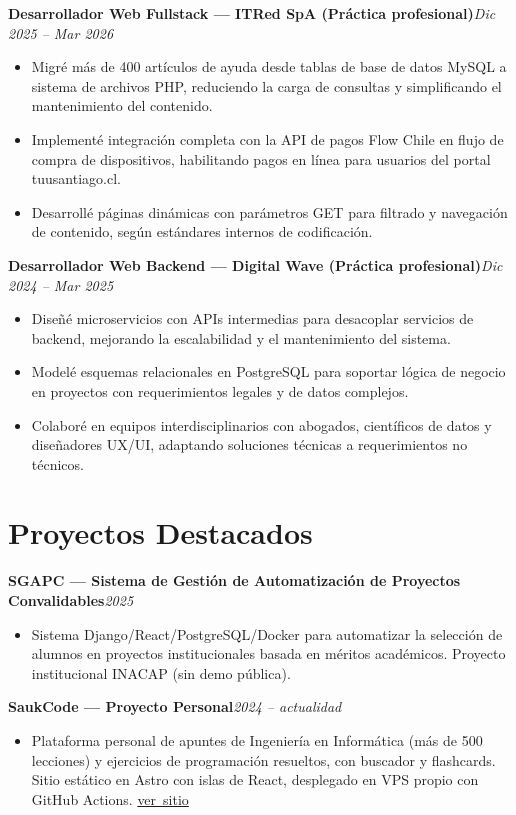 \documentclass[10pt,a4paper]{article}
\newcommand{\entryheader}[3]{%
    \par\vspace{7pt}\textbf{#1}\hfill\textit{#2}\\[-8pt]
}
\begin{document}
\entryheader{Desarrollador Web Fullstack --- ITRed SpA \small{(Práctica profesional)}}{Dic 2025 -- Mar 2026}{}
\begin{itemize}
    \item Migré más de 400 artículos de ayuda desde tablas de base de datos MySQL a sistema de archivos PHP, reduciendo la carga de consultas y simplificando el mantenimiento del contenido.
    \item Implementé integración completa con la API de pagos Flow Chile en flujo de compra de dispositivos, habilitando pagos en línea para usuarios del portal tuusantiago.cl.
    \item Desarrollé páginas dinámicas con parámetros GET para filtrado y navegación de contenido, según estándares internos de codificación.
\end{itemize}

\entryheader{Desarrollador Web Backend --- Digital Wave \small{(Práctica profesional)}}{Dic 2024 -- Mar 2025}{}
\begin{itemize}
    \item Diseñé microservicios con APIs intermedias para desacoplar servicios de backend, mejorando la escalabilidad y el mantenimiento del sistema.
    \item Modelé esquemas relacionales en PostgreSQL para soportar lógica de negocio en proyectos con requerimientos legales y de datos complejos.
    \item Colaboré en equipos interdisciplinarios con abogados, científicos de datos y diseñadores UX/UI, adaptando soluciones técnicas a requerimientos no técnicos.
\end{itemize}

\section{Proyectos Destacados}

\entryheader{SGAPC --- Sistema de Gestión de Automatización de Proyectos Convalidables}{2025}{}
\begin{itemize}
    \item Sistema Django/React/PostgreSQL/Docker para automatizar la selección de alumnos en proyectos institucionales basada en méritos académicos. Proyecto institucional INACAP (sin demo pública).
\end{itemize}

\entryheader{SaukCode --- Proyecto Personal}{2024 -- actualidad}{}
\begin{itemize}
    \item Plataforma personal de apuntes de Ingeniería en Informática (más de 500 lecciones) y ejercicios de programación resueltos, con buscador y flashcards. Sitio estático en Astro con islas de React, desplegado en VPS propio con GitHub Actions. \href{https://saukcode.cl}{ver~sitio}
\end{itemize}
\end{document}
